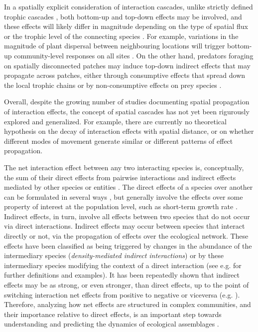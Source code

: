 In a spatially explicit consideration of interaction cascades, unlike strictly defined trophic cascades \citep{Ripple2016}, both bottom-up and top-down effects may be involved, and these effects will likely differ in magnitude depending on the type of spatial flux or the trophic level of the connecting species \citep{Allen2016}. For example, variations in the magnitude of plant dispersal between neighbouring locations will trigger bottom-up community-level responses on all sites \citep{Christian2001}. On the other hand, predators foraging on spatially disconnected patches may induce top-down indirect effects that may propagate across patches, either through consumptive effects that spread down the local trophic chains \citep{Polis1997} or by non-consumptive effects on prey species \citep{Orrock2008}.

Overall, despite the growing number of studies documenting spatial propagation of interaction effects, the concept of spatial cascades has not yet been rigurously explored and generalized. For example, there are currently no theoretical hypothesis on the decay of interaction effects with spatial distance, or on whether different modes of movement generate similar or different patterns of effect propagation.

The net interaction effect between any two interacting species is, conceptually, the sum of their direct effects from pairwise interactions and indirect effects mediated by other species or entities \citep{Abrams1987}. The direct effects of a species over another can be formulated in several ways \citep{Berlow2004}, but generally involve the effects over some property of interest at the population level, such as short-term growth rate \citep{Abrams1987}. Indirect effects, in turn, involve all effects between two species that do not occur via direct interactions. Indirect effects may occur between species that interact directly or not, via the propagation of effects over the ecological network. These effects have been classified as being triggered by changes in the abundance of the intermediary species (\textit{density-mediated indirect interactions}) or by these intermediary species modifying the context of a direct interaction (see e.g. \citealt{Wootton2002} for further definitions and examples). It has been repeatedly shown that indirect effects may be as strong, or even stronger, than direct effects, up to the point of switching interaction net effects from positive to negative or viceversa (e.g. \citealt{Menge1995}). Therefore, analyzing how net effects are structured in complex communities, and their importance relative to direct effects, is an important step towards understanding and predicting the dynamics of ecological assemblages \citep{Montoya2009a}.

